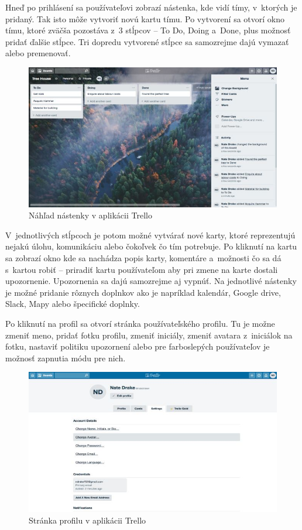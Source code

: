 \indent Hneď po prihlásení sa používateľovi zobrazí nástenka, kde vidí tímy, v ktorých je pridaný. Tak isto môže vytvoriť novú kartu tímu. Po vytvorení sa otvorí okno tímu, ktoré zväčša pozostáva z 3 stĺpcov – To Do, Doing a Done, plus možnosť pridať ďalšie stĺpce. Tri dopredu vytvorené stĺpce sa samozrejme dajú vymazať alebo premenovať. 

\begin{figure}[H]
    \centering
    \includegraphics[scale=0.65]{img/obr-trello.jpg}
    \caption{Náhľad nástenky v aplikácii Trello\cite{trello}}
    \label{fig:nastenka}
\end{figure}

\indent V jednotlivých stĺpcoch je potom možné vytvárať nové karty, ktoré reprezentujú nejakú úlohu, komunikáciu alebo čokoľvek čo tím potrebuje. Po kliknutí na kartu sa zobrazí okno kde sa nachádza popis karty, komentáre a možnosti čo sa dá s kartou robiť – priradiť kartu používateľom aby pri zmene na karte dostali upozornenie. Upozornenia sa dajú samozrejme aj vypnúť. Na jednotlivé nástenky je možné pridanie rôznych doplnkov ako je napríklad kalendár, Google drive, Slack, Mapy alebo špecifické doplnky. 

\indent Po kliknutí na profil sa otvorí stránka používateľského profilu. Tu je možne zmeniť meno, pridať fotku profilu, zmeniť iniciály, zmeniť avatara z iniciálok na fotku, nastaviť politiku upozornení alebo pre farboslepých používateľov je možnosť zapnutia módu pre nich\cite{trello_use}. 

\begin{figure}[H]
    \centering
    \includegraphics[scale=0.65]{img/obr-trello-profil.jpg}
    \caption{Stránka profilu v aplikácii Trello\cite{trello}}
    \label{fig:profil}
\end{figure}

